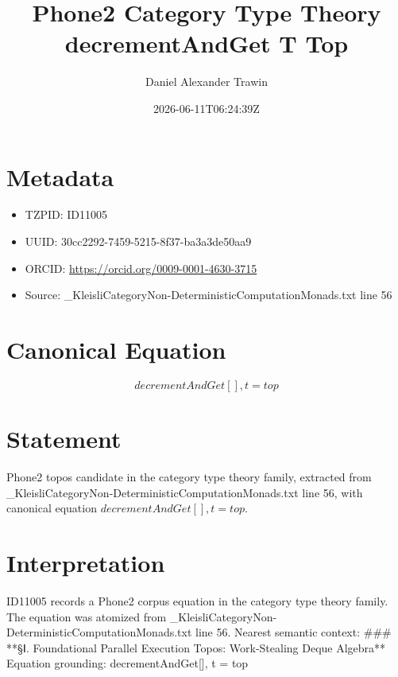 \documentclass[11pt]{article}
\title{Phone2 Category Type Theory decrementAndGet T Top}
\author{Daniel Alexander Trawin}
\date{2026-06-11T06:24:39Z}
\begin{document}
\maketitle
\section*{Metadata}
\begin{itemize}
\item TZPID: ID11005
\item UUID: 30cc2292-7459-5215-8f37-ba3a3de50aa9
\item ORCID: \url{https://orcid.org/0009-0001-4630-3715}
\item Source: _KleisliCategoryNon-DeterministicComputationMonads.txt line 56
\end{itemize}
\section*{Canonical Equation}
\[
decrementAndGet[], t = top
\]
\section*{Statement}
Phone2 topos candidate in the category type theory family, extracted from _KleisliCategoryNon-DeterministicComputationMonads.txt line 56, with canonical equation $decrementAndGet[], t = top$.
\section*{Interpretation}
ID11005 records a Phone2 corpus equation in the category type theory family. The equation was atomized from _KleisliCategoryNon-DeterministicComputationMonads.txt line 56. Nearest semantic context: ### **§Ⅰ. Foundational Parallel Execution Topos: Work-Stealing Deque Algebra** Equation grounding: decrementAndGet[], t = top
\end{document}
